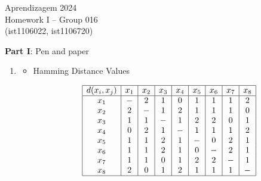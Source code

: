 \documentclass[12pt]{article}
\begin{document}
\center
Aprendizagem 2024\\
Homework I -- Group 016\\
(ist1106022, ist1106720)\vskip 1cm

\large{\textbf{Part I}: Pen and paper}\normalsize

\begin{enumerate}[leftmargin=\labelsep, label=\textbf{\arabic*.)}]
    \item \begin{itemize}
              \item Hamming Distance Values \\
                    \vspace{0.5em}
                    \begin{minipage}{1\textwidth}
                        \begin{center}
                            \[\begin{array}{|c|c|c|c|c|c|c|c|c|}
                                    \hline
                                    d(x_i, x_j) & x_1 & x_2 & x_3 & x_4 & x_5 & x_6 & x_7 & x_8 \\
                                    \hline
                                    x_1         & -   & 2   & 1   & 0   & 1   & 1   & 1   & 2   \\
                                    x_2         & 2   & -   & 1   & 2   & 1   & 1   & 1   & 0   \\
                                    x_3         & 1   & 1   & -   & 1   & 2   & 2   & 0   & 1   \\
                                    x_4         & 0   & 2   & 1   & -   & 1   & 1   & 1   & 2   \\
                                    x_5         & 1   & 1   & 2   & 1   & -   & 0   & 2   & 1   \\
                                    x_6         & 1   & 1   & 2   & 1   & 0   & -   & 2   & 1   \\
                                    x_7         & 1   & 1   & 0   & 1   & 2   & 2   & -   & 1   \\
                                    x_8         & 2   & 0   & 1   & 2   & 1   & 1   & 1   & -   \\
                                    \hline
                                \end{array}\]
                        \end{center}
                    \end{minipage}

\end{itemize}
\end{enumerate}
\end{document}
